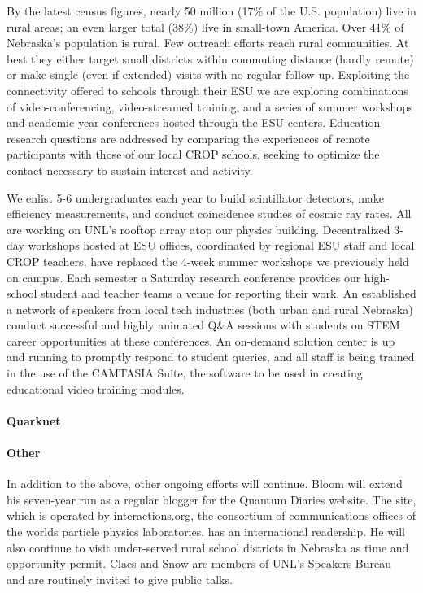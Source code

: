 By the latest census figures, nearly 50 million (17\% of the U.S. population) live in rural areas; an even larger total (38\%) live in small-town America.  Over 41\% of Nebraska's population is rural. Few outreach efforts reach rural communities. At best they either target small districts within commuting distance (hardly remote) or make single (even if extended) visits with no regular follow-up. Exploiting the connectivity offered to schools through their ESU we are exploring combinations of video-conferencing, video-streamed training, and a series of summer workshops and academic year conferences hosted through the ESU centers. Education research questions are addressed by comparing the experiences of remote participants with those of our local CROP schools, seeking to optimize the contact necessary to sustain interest and activity.

We enlist 5-6 undergraduates each year to build scintillator detectors, make efficiency measurements, and conduct coincidence studies of cosmic ray rates.  All are working on UNL’s rooftop array atop our physics building. Decentralized 3-day workshops hosted at ESU offices, coordinated by regional ESU staff and local CROP teachers, have replaced the 4-week summer workshops we previously held on campus. Each semester a Saturday research conference provides our high-school student and teacher teams a venue for reporting their work. An established a network of speakers from local tech industries (both urban and rural Nebraska) conduct successful and highly animated Q\&A sessions with students on STEM career opportunities at these conferences. An on-demand solution center is up and running to promptly respond to student queries, and all staff is being trained in the use of the CAMTASIA Suite, the software to be used in creating educational video training modules.

\paragraph{Quarknet}

\paragraph{Other} In addition to the above, other ongoing efforts will continue.  Bloom will extend his seven-year run as a regular blogger for the Quantum Diaries website.  The site, which is operated by interactions.org, the consortium of communications offices of the worlds particle physics laboratories, has an international readership.  He will also continue to visit under-served rural school districts in Nebraska as time and opportunity permit.  Claes and Snow are members of UNL’s Speakers Bureau~\cite{bib:speakers} and are routinely invited to give public talks. 
